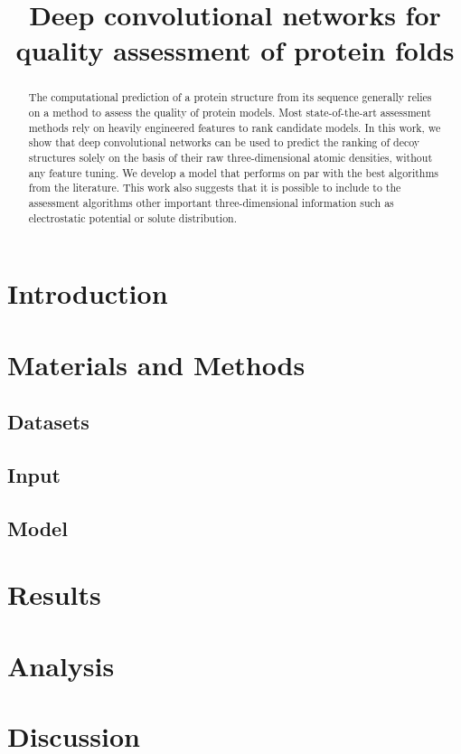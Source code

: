 \documentclass[letter,10pt]{article}
\title{Deep convolutional networks for quality assessment of protein folds}
\author{}
\begin{document}
\maketitle

\begin{abstract}
The computational prediction of a protein structure from its sequence
generally relies on a method to assess the quality of protein
models. Most state-of-the-art assessment methods rely on heavily
engineered features to rank candidate models. In this work, we show
that deep convolutional networks can be used to predict the ranking of
decoy structures solely on the basis of their raw three-dimensional
atomic densities, without any feature tuning.  We develop a model that
performs on par with the best algorithms from the literature. This
work also suggests that it is possible to include to the assessment
algorithms other important three-dimensional information such as
electrostatic potential or solute distribution.
\end{abstract}

\section{Introduction}


\section{Materials and Methods}

\subsection{Datasets}


\subsection{Input}


\subsection{Model}




\section{Results}


\section{Analysis}


\section{Discussion}




\end{document}
